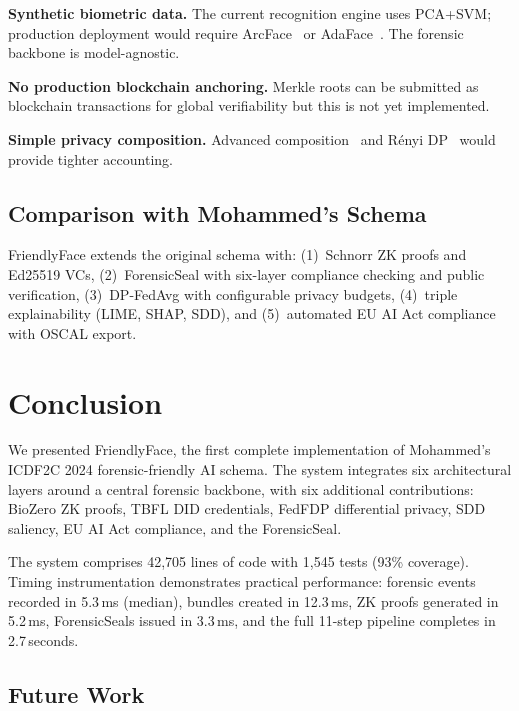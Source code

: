 \documentclass[conference]{IEEEtran}
\begin{document}
\textbf{Synthetic biometric data.} The current recognition engine uses PCA+SVM; production deployment would require ArcFace~\cite{deng2019arcface} or AdaFace~\cite{kim2022adaface}. The forensic backbone is model-agnostic.

\textbf{No production blockchain anchoring.} Merkle roots can be submitted as blockchain transactions for global verifiability but this is not yet implemented.

\textbf{Simple privacy composition.} Advanced composition~\cite{dwork2010boosting} and R\'{e}nyi DP~\cite{mironov2017renyi} would provide tighter accounting.

\subsection{Comparison with Mohammed's Schema}

FriendlyFace extends the original schema with: (1)~Schnorr ZK proofs and Ed25519 VCs, (2)~ForensicSeal with six-layer compliance checking and public verification, (3)~DP-FedAvg with configurable privacy budgets, (4)~triple explainability (LIME, SHAP, SDD), and (5)~automated EU AI Act compliance with OSCAL export.

\section{Conclusion}

We presented FriendlyFace, the first complete implementation of Mohammed's ICDF2C 2024 forensic-friendly AI schema. The system integrates six architectural layers around a central forensic backbone, with six additional contributions: BioZero ZK proofs, TBFL DID credentials, FedFDP differential privacy, SDD saliency, EU AI Act compliance, and the ForensicSeal.

The system comprises 42,705 lines of code with 1,545 tests (93\% coverage). Timing instrumentation demonstrates practical performance: forensic events recorded in 5.3\,ms (median), bundles created in 12.3\,ms, ZK proofs generated in 5.2\,ms, ForensicSeals issued in 3.3\,ms, and the full 11-step pipeline completes in 2.7\,seconds.

\subsection{Future Work}
\end{document}
